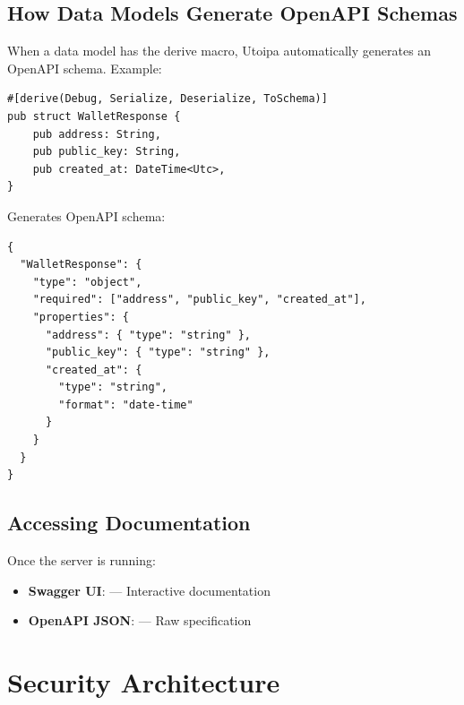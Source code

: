 \subsection{How Data Models Generate OpenAPI Schemas}

When a data model has the  derive macro, Utoipa automatically generates an OpenAPI schema. Example:

\begin{listing}[htbp]
\caption{Data model with OpenAPI schema generation}
\label{lst:toschema-example}
\begin{verbatim}
#[derive(Debug, Serialize, Deserialize, ToSchema)]
pub struct WalletResponse {
    pub address: String,
    pub public_key: String,
    pub created_at: DateTime<Utc>,
}
\end{verbatim}
\end{listing}

Generates OpenAPI schema:

\begin{listing}[htbp]
\caption{Generated OpenAPI schema from model}
\label{lst:openapi-schema-generated}
\begin{verbatim}
{
  "WalletResponse": {
    "type": "object",
    "required": ["address", "public_key", "created_at"],
    "properties": {
      "address": { "type": "string" },
      "public_key": { "type": "string" },
      "created_at": {
        "type": "string",
        "format": "date-time"
      }
    }
  }
}
\end{verbatim}
\end{listing}

\subsection{Accessing Documentation}

Once the server is running:

\begin{itemize}
  \item \textbf{Swagger UI}:  --- Interactive documentation
  \item \textbf{OpenAPI JSON}:  --- Raw specification
\end{itemize}

\section{Security Architecture}
\label{sec:security}

